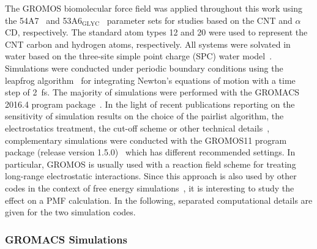 \documentclass[9pt,lessons,pubversion]{livecoms}
\begin{document}
The GROMOS biomolecular force field was applied throughout this work using the 54A7~\cite{schmid2011definition} and 53A6$_\mathrm{GLYC}$~\cite{pol2012gromos} parameter sets for studies based on the CNT and 
$\alpha$CD, respectively. 
The standard atom types 12 and 20 were used to represent the CNT carbon and hydrogen atoms, respectively. 
All systems were solvated in water based on the three-site simple point charge (SPC) water model~\cite{berendsen1981interaction}.
Simulations were conducted under periodic boundary conditions using the leapfrog algorithm~\cite{eastwood1981computer} for integrating Newton's equations of motion with a time step of 2~fs.
The majority of simulations were performed with the GROMACS 2016.4 program package~\cite{berendsen1995gromacs, hess2008gromacs, abraham2015gromacs}.
In the light of recent publications reporting on the sensitivity of simulation results on the choice of the pairlist algorithm, the electrostatics treatment, the cut-off scheme or other 
technical details~\cite{silva2018impact, gonccalves2019influence, reisser2017real, loeffler2018reproducibility}, complementary simulations were conducted with the GROMOS11 program package (release version 1.5.0)~\cite{kunz2012new, riniker2011calculation, schmid2012architecture} which has different recommended settings.
In particular, GROMOS is usually used with a reaction field scheme for treating long-range electrostatic interactions. Since this approach is also used by other codes in the context of free energy 
simulations~\cite{papadourakis2018blinded, aaqvist2017cold}, it is interesting to study the effect on a PMF calculation.
In the following, separated computational details are given for the two simulation codes.

\subsubsection*{GROMACS Simulations}
\end{document}
